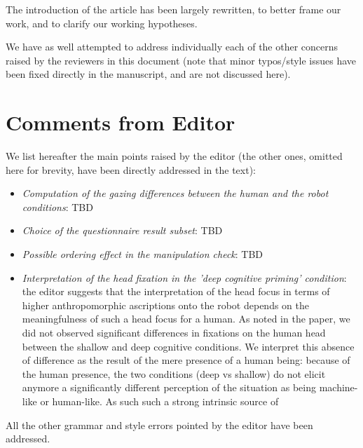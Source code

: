 \documentclass{article}
\begin{document}
The introduction of the article has been largely rewritten, to better frame our
work, and to clarify our working hypotheses.


We have as well attempted to address individually each of the other concerns
raised by the reviewers in this document (note that minor typos/style issues
have been fixed directly in the manuscript, and are not discussed here).


\section{Comments from Editor}


We list hereafter the main points raised by the editor (the other ones, omitted
here for brevity, have been directly addressed in the text):

\begin{itemize}
    \item \emph{Computation of the gazing differences between the human and the
        robot conditions}: TBD
    \item \emph{Choice of the questionnaire result subset}: TBD
    \item \emph{Possible ordering effect in the manipulation check}: TBD
    \item \emph{Interpretation of the head fixation in the 'deep cognitive
        priming' condition}: the editor suggests that the interpretation of the
        head focus in terms of higher anthropomorphic ascriptions onto the robot
        depends on the meaningfulness of such a head focus for a human. As noted
        in the paper, we did not observed significant differences in fixations
        on the human head between the shallow and deep cognitive conditions. We
        interpret this absence of difference as the result of the mere presence
        of a human being: because of the human presence, the two conditions
        (deep vs shallow) do not elicit anymore a significantly different perception of
        the situation as being machine-like or human-like. As such
        such a strong intrinsic source of 

\end{itemize}

All the other grammar and style errors pointed by the editor have been addressed.



\end{document}
